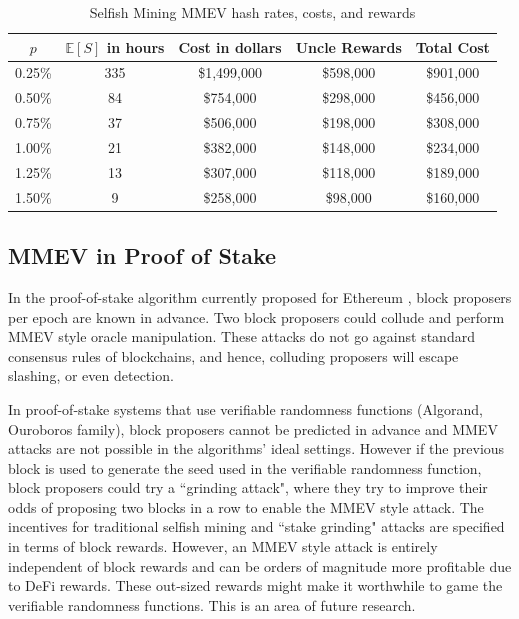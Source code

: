 \begin{table}[h!]
\begin{center}
 \begin{tabular}{|c |c| c | c | c|} 
 \hline
 $p$ & $\mathbb{E}[S]$ in hours & Cost in dollars & Uncle Rewards & Total Cost\\ [0.5ex] 
 \hline
  0.25\% & 335& \$1,499,000 & \$598,000 &\$901,000\\
  \hline
  0.50\% & 84& \$754,000 & \$298,000 &\$456,000\\
  \hline
  0.75\% & 37& \$506,000 & \$198,000 &\$308,000\\
  \hline
  1.00\% & 21& \$382,000 & \$148,000 &\$234,000\\
  \hline
  1.25\% & 13& \$307,000 & \$118,000 &\$189,000\\
  \hline
  1.50\% & 9& \$258,000 & \$98,000 &\$160,000\\
  \hline
\end{tabular}
\end{center}
\caption{Selfish Mining MMEV hash rates, costs, and rewards}
\label{TableHittingTime}
\end{table}

\subsection{MMEV in Proof of Stake}
In the proof-of-stake algorithm currently proposed for Ethereum \cite{proof_of_stake}, block proposers per epoch are known in advance. Two block proposers could collude and perform MMEV style oracle manipulation. These attacks do not go against standard consensus rules of blockchains, and hence, colluding proposers will escape slashing, or even detection.

In proof-of-stake systems that use verifiable randomness functions (Algorand, Ouroboros family), block proposers cannot be predicted in advance and MMEV attacks are not possible in the algorithms' ideal settings. However if the previous block is used to generate the seed used in the verifiable randomness function, block proposers could try a ``grinding attack", where they try to improve their odds of proposing two blocks in a row to enable the MMEV style attack. The incentives for traditional selfish mining and ``stake grinding" attacks are specified in terms of block rewards. However, an MMEV style attack is entirely independent of block rewards and can be orders of magnitude more profitable due to DeFi rewards. These out-sized rewards might make it worthwhile to game the verifiable randomness functions. This is an area of future research.

